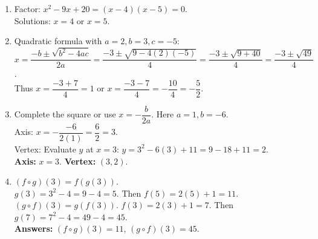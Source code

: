 \documentclass[11pt]{article}
\begin{document}
\begin{enumerate}
\item Factor: $x^2 - 9x + 20 = (x - 4)(x - 5) = 0$.\\
Solutions: $x = 4$ or $x = 5$.

\item Quadratic formula with $a=2, b=3, c=-5$:\\
$x = \dfrac{-b \pm \sqrt{b^2 - 4ac}}{2a} = \dfrac{-3 \pm \sqrt{9 - 4(2)(-5)}}{4} = \dfrac{-3 \pm \sqrt{9 + 40}}{4} = \dfrac{-3 \pm \sqrt{49}}{4}$.\\
Thus $x = \dfrac{-3 + 7}{4} = 1$ or $x = \dfrac{-3 - 7}{4} = -\dfrac{10}{4} = -\dfrac{5}{2}$.

\item Complete the square or use $x = -\dfrac{b}{2a}$. Here $a=1, b=-6$.\\
Axis: $x = -\dfrac{-6}{2(1)} = \dfrac{6}{2} = 3$.\\
Vertex: Evaluate $y$ at $x=3$: $y = 3^2 - 6(3) + 11 = 9 - 18 + 11 = 2$.\\
\textbf{Axis:} $x=3$. \textbf{Vertex:} $(3, 2)$.

\item $(f\circ g)(3) = f(g(3))$.\\
$g(3) = 3^2 - 4 = 9 - 4 = 5$. Then $f(5) = 2(5) + 1 = 11$.\\
$(g\circ f)(3) = g(f(3))$. $f(3) = 2(3) + 1 = 7$. Then $g(7) = 7^2 - 4 = 49 - 4 = 45$.\\
\textbf{Answers:} $(f\circ g)(3) = 11$, $(g\circ f)(3) = 45$.

\end{enumerate}
\end{document}
